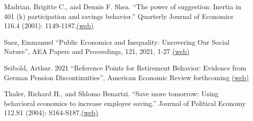 \documentclass[landscape]{slides}
\begin{document}
\begin{slide}
{Madrian, Brigitte C., and Dennis F. Shea. ``The power of suggestion: Inertia in 401 (k) participation and savings behavior.'' Quarterly Journal of Economics 116.4 (2001): 1149-1187.\href{http://www.jstor.org/stable/pdfplus/2696456.pdf}{(web)}

Saez, Emmanuel  ``Public Economics and Inequality: Uncovering Our Social Nature'', AEA Papers and Proceedings, 121, 2021, 1-27
\href{https://eml.berkeley.edu/~saez/saez-AEAlecture.pdf} {(web)} 

Seibold, Arthur. 2021 ``Reference Points for Retirement Behavior: Evidence from German
Pension Discontinuities'', American Economic Review forthcoming  \href{http://elsa.berkeley.edu/~saez/course/seiboldAER21.pdf} {(web)} 

Thaler, Richard H., and Shlomo Benartzi. ``Save more tomorrow: Using behavioral economics to increase employee saving.'' Journal of Political Economy 112.S1 (2004): S164-S187.\href{http://www.jstor.org/stable/pdfplus/10.1086/380085.pdf}{(web)}


}

\end{slide}
\end{document}
